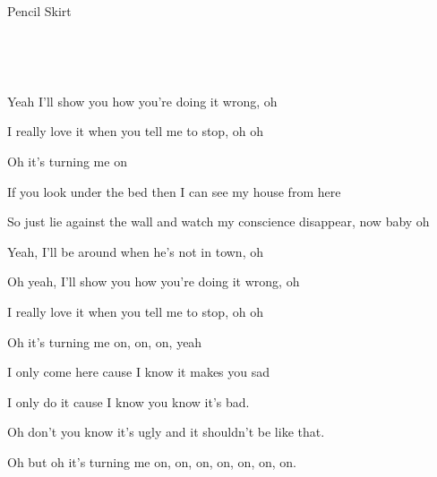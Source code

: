 \begin{song}{Pencil Skirt}{
	

	\mbox{ \CMaj \AMaj \DMaj \GMaj }


	\mbox{ \EmShAm \CMajShE \DMajShA \GMajShE}
	
}
\begin{SongVerse}
 Yeah I'll show you how you're doing it wrong, oh 


 I really love it when you tell me to stop, oh oh 
                
 
 Oh it's turning me on

\end{SongVerse}


\begin{SongVerse}
 If you look under the bed then I can see my house from here

 So just lie against  the wall and watch my  conscience disappear, now baby oh


 Yeah, I'll be around when he's not in town, oh
 
 
 Oh yeah, I'll show you how you're doing it wrong, oh
 
 
 I really love it when you tell me to stop, oh oh
 
                  
 Oh it's turning me on, on, on, yeah

\end{SongVerse}


 \begin{SongVerse}

 \hspace{10pt}I only come here cause I know it makes you sad
 
 
 
 \hspace{10pt}I only do it cause I know you know it's bad.
 
 
 
 \hspace{10pt}Oh don't you know it's ugly and it shouldn't be like that.
 
                          
 \hspace{10pt}Oh but oh it's turning me on, on, on, on, on, on, on.


  \hspace{15pt}   \hspace{15pt}     \hspace{15pt}   
 \end{SongVerse}

\end{song}
